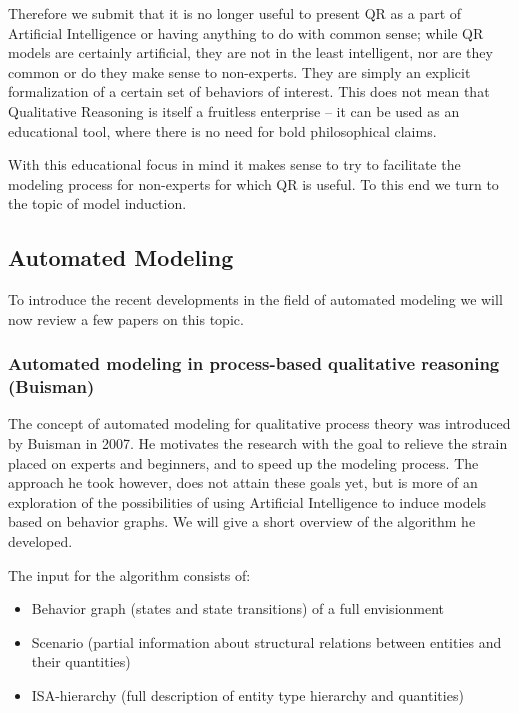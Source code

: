 \documentclass{article} %
\begin{document}
Therefore we submit that it is no longer useful to present QR as a part of
Artificial Intelligence or having anything to do with common sense; while QR
models are certainly artificial, they are not in the least intelligent, nor are
they common or do they make sense to non-experts.  They are simply an explicit
formalization of a certain set of behaviors of interest. This does not mean
that Qualitative Reasoning is itself a fruitless enterprise -- it can be used
as an educational tool, where there is no need for bold philosophical claims.

With this educational focus in mind it makes sense to try to facilitate the
modeling process for non-experts for which QR is useful. To this end we turn
to the topic of model induction.

\subsection{Automated Modeling} %
\label{sec:litrev_am}
To introduce the recent developments in the field of automated modeling we
will now review a few papers on this topic.

\subsubsection{Automated modeling in process-based qualitative reasoning
(Buisman)}
\label{sec:litrev_am_buisman}
The concept of automated modeling for qualitative process theory was
introduced by Buisman \cite{buisman} in 2007. He motivates the research with
the goal to relieve the strain placed on experts and beginners, and to speed
up the modeling process. The approach he took however, does not attain these
goals yet, but is more of an exploration of the possibilities of using
Artificial Intelligence to induce models based on behavior graphs. We will
give a short overview of the algorithm he developed.

The input for the algorithm consists of:

\begin{itemize}

\item Behavior graph (states and state transitions) of a full envisionment

\item Scenario (partial information about structural relations between entities and their quantities)

\item ISA-hierarchy (full description of entity type hierarchy and quantities)

\end{itemize}
\end{document}
